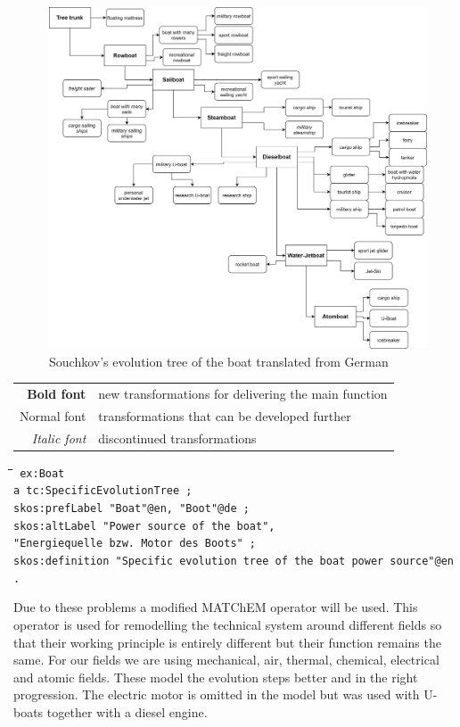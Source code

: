 \documentclass[11pt,a4paper]{article}
\newenvironment{code}{\tt \begin{tabbing}
\hskip12pt\=\hskip12pt\=\hskip12pt\=\hskip12pt\=\hskip5cm\=\hskip5cm\=\kill}
{\end{tabbing}}
\begin{document}
\begin{figure}[htb]
  \centering
  \includegraphics[width=\linewidth]{figures/boat.png}
  \caption{\small Souchkov's evolution tree of the boat translated from German
    \cite{KS}}
	\label{fig:boat}
\end{figure}
\begin{tabular}{r@{: }l}
\textbf{Bold font} & new transformations for delivering the main function\\
Normal font & transformations that can be developed further\\
\textit{Italic font} & discontinued transformations
\end{tabular}

\begin{code}\tt
ex:Boat \\
\> a tc:SpecificEvolutionTree ; \\
\> skos:prefLabel "Boat"@en, "Boot"@de ; \\
\> skos:altLabel "Power source of the boat", \\
\>\> "Energiequelle bzw. Motor des Boots" ; \\
\> skos:definition "Specific evolution tree of the boat power source"@en . \\
\end{code}

Due to these problems a modified MATChEM operator will be used. This operator
is used for remodelling the technical system around different fields so that
their working principle is entirely different but their function remains the
same. For our fields we are using mechanical, air, thermal, chemical,
electrical and atomic fields. These model the evolution steps better and in
the right progression. The electric motor is omitted in the model but was used
with U-boats together with a diesel engine.
\end{document}
